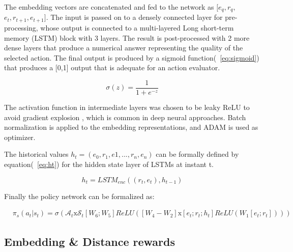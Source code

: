 The embedding vectors are concatenated and fed to the network as $[e_q,r_q,$ \\$e_t,r_{t+1},e_{t+1}]$. The input is passed on to a densely connected layer for pre-processing, whose output is connected to a multi-layered Long short-term memory (LSTM) \cite{hochreiter1997long} block with 3 layers. The result is post-processed with 2 more dense layers that produce a numerical answer representing the quality of the selected action. The final output is produced by a sigmoid function(~\ref{eq:sigmoid}) that produces a [0,1] output that is adequate for an action evaluator.

\begin{equation}
\label{eq:sigmoid}
    \sigma(z) = \frac{1} {1 + e^{-z}}
\end{equation}

The activation function in intermediate layers was chosen to be leaky ReLU to avoid gradient explosion \cite{bengio1994learning}, which is common in deep neural approaches. Batch normalization is applied to the embedding representations, and ADAM \cite{kingma2014adam} is used as optimizer. 

The historical values $h_t = (e_0,r_1,e1,...,r_n,e_n)$ can be formally defined by equation(~\ref{eq:ht}) for the hidden state layer of LSTMs at instant t.

\begin{equation}
\label{eq:ht}
    h_t = LSTM_{enc}((r_t,e_t), h_{t-1})
\end{equation}

Finally the policy network can be formalized as:

\begin{equation}
\label{eq:pn}
\begin{split}
    & \pi_s(a_t|s_t) = \sigma(\mathcal{A}_t \text{x} \mathcal{S}_t [W_6;W_5]ReLU([W_4-W_2]\text{x}[e_t;r_t;h_t]ReLU(W_1[e_t;r_t])))
\end{split}
\end{equation}


\subsection{Embedding \& Distance rewards}
\label{sec:spacerl-rewards}

